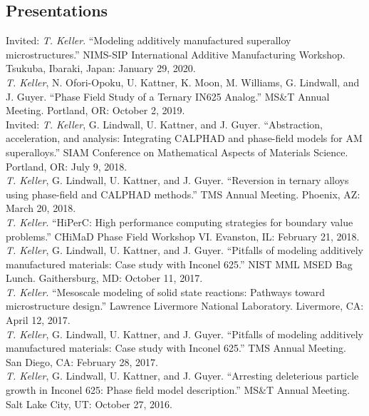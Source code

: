 \documentclass[margin]{res}
\begin{document}
\begin{resume}
\section{Presentations}
Invited: \emph{T. Keller}. ``Modeling additively manufactured superalloy microstructures.''
 NIMS-SIP International Additive Manufacturing Workshop. Tsukuba, Ibaraki, Japan: January 29, 2020.\\[0.25\baselineskip]
\baselineskip
\emph{T. Keller}, N. Ofori-Opoku, U. Kattner, K. Moon, M. Williams, G. Lindwall, and J. Guyer. ``Phase Field Study of a Ternary IN625 Analog.''
 MS\&T Annual Meeting. Portland, OR: October 2, 2019.\\[0.25\baselineskip]
\baselineskip
Invited: \emph{T. Keller}, G. Lindwall, U. Kattner, and J. Guyer. ``Abstraction, acceleration, and analysis: Integrating CALPHAD and phase-field models for AM superalloys.''
 SIAM Conference on Mathematical Aspects of Materials Science. Portland, OR: July 9, 2018.\\[0.25\baselineskip]
\emph{T. Keller}, G. Lindwall, U. Kattner, and J. Guyer. ``Reversion in ternary alloys using phase-field and CALPHAD methods.''
 TMS Annual Meeting. Phoenix, AZ: March 20, 2018.\\[0.25\baselineskip]
\emph{T. Keller}. ``HiPerC: High performance computing strategies for boundary value problems.''
 CHiMaD Phase Field Workshop VI. Evanston, IL: February 21, 2018.\\[0.25\baselineskip]
\baselineskip
\emph{T. Keller}, G. Lindwall, U. Kattner, and J. Guyer. ``Pitfalls of modeling additively manufactured materials: Case study with Inconel 625.''
 NIST MML MSED Bag Lunch. Gaithersburg, MD: October 11, 2017.\\[0.25\baselineskip]
\emph{T. Keller}. ``Mesoscale modeling of solid state reactions: Pathways toward microstructure design.''
 Lawrence Livermore National Laboratory. Livermore, CA: April 12, 2017.\\[0.25\baselineskip]
\emph{T. Keller}, G. Lindwall, U. Kattner, and J. Guyer. ``Pitfalls of modeling additively manufactured materials: Case study with Inconel 625.''
 TMS Annual Meeting. San Diego, CA: February 28, 2017.\\[0.25\baselineskip]
\baselineskip
\emph{T. Keller}, G. Lindwall, U. Kattner, and J. Guyer. ``Arresting deleterious particle growth in Inconel 625: Phase field model description.''
 MS\&T Annual Meeting. Salt Lake City, UT: October 27, 2016.\\[0.25\baselineskip]

\end{resume}
\end{document}
